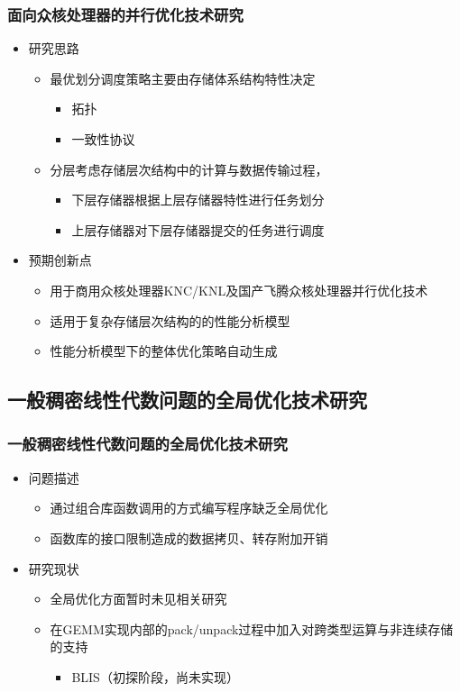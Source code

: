 \documentclass[aspectratio=169]{beamer}
\begin{document}
\begin{frame}
  \frametitle{面向众核处理器的并行优化技术研究}
  \begin{itemize}
  \item 研究思路
    \begin{itemize}
    \item 最优划分调度策略主要由存储体系结构特性决定
      \begin{itemize}
      \item 拓扑
      \item 一致性协议
      \end{itemize}
    \item 分层考虑存储层次结构中的计算与数据传输过程，
      \begin{itemize}
      \item 下层存储器根据上层存储器特性进行任务划分
      \item 上层存储器对下层存储器提交的任务进行调度
      \end{itemize}
    \end{itemize}
  \item 预期创新点
    \begin{itemize}
    \item 用于商用众核处理器KNC/KNL及国产飞腾众核处理器并行优化技术
    \item 适用于复杂存储层次结构的的性能分析模型
    \item 性能分析模型下的整体优化策略自动生成
    \end{itemize}
  \end{itemize}
\end{frame}

\subsection[全局优化技术研究]{一般稠密线性代数问题的全局优化技术研究}

\begin{frame}
  \frametitle{一般稠密线性代数问题的全局优化技术研究}
  \begin{itemize}
  \item 问题描述
    \begin{itemize}
    \item 通过组合库函数调用的方式编写程序缺乏全局优化 %
    \item 函数库的接口限制造成的数据拷贝、转存附加开销
    \end{itemize}
  \item 研究现状
    \begin{itemize}
    \item 全局优化方面暂时未见相关研究
    \item 在GEMM实现内部的pack/unpack过程中加入对跨类型运算与非连续存储的支持
      \begin{itemize}
      \item BLIS（初探阶段，尚未实现）
      \end{itemize}
    \end{itemize}
  \end{itemize}
\end{frame}
\end{document}

